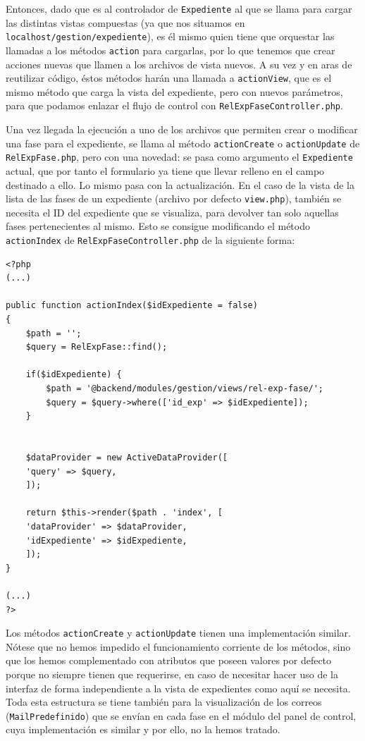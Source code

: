 Entonces, dado que es al controlador de \texttt{Expediente} al que se llama para cargar las distintas vistas compuestas (ya que nos situamos en \texttt{localhost/gestion/expediente}), es él mismo quien tiene que orquestar las llamadas a los métodos \texttt{action} para cargarlas, por lo que tenemos que crear acciones nuevas que llamen a los archivos de vista nuevos. A su vez y en aras de reutilizar código, éstos métodos harán una llamada a \texttt{actionView}, que es el mismo método que carga la vista del expediente, pero con nuevos parámetros, para que podamos enlazar el flujo de control con \texttt{RelExpFaseController.php}.

Una vez llegada la ejecución a uno de los archivos que permiten crear o modificar una fase para el expediente, se llama al método \texttt{actionCreate} o \texttt{actionUpdate} de \texttt{RelExpFase.php}, pero con una novedad: se pasa como argumento el \texttt{Expediente} actual, que por tanto el formulario ya tiene que llevar relleno en el campo destinado a ello. Lo mismo pasa con la actualización. En el caso de la vista de la lista de las fases de un expediente (archivo por defecto \texttt{view.php}), también se necesita el ID del expediente que se visualiza, para devolver tan solo aquellas fases pertenecientes al mismo. Esto se consigue modificando el método \texttt{actionIndex} de \texttt{RelExpFaseController.php} de la siguiente forma:

\begin{verbatim}
<?php
(...)

public function actionIndex($idExpediente = false)
{
	$path = '';
	$query = RelExpFase::find();
	
	if($idExpediente) {
		$path = '@backend/modules/gestion/views/rel-exp-fase/';
		$query = $query->where(['id_exp' => $idExpediente]);
	}
	
	
	$dataProvider = new ActiveDataProvider([
	'query' => $query,
	]);
	
	return $this->render($path . 'index', [
	'dataProvider' => $dataProvider,
	'idExpediente' => $idExpediente,
	]);
}

(...)
?>
\end{verbatim}

Los métodos \texttt{actionCreate} y \texttt{actionUpdate} tienen una implementación similar. Nótese que no hemos impedido el funcionamiento corriente de los métodos, sino que los hemos complementado con atributos que poseen valores por defecto porque no siempre tienen que requerirse, en caso de necesitar hacer uso de la interfaz de forma independiente a la vista de expedientes como aquí se necesita. Toda esta estructura se tiene también para la visualización de los correos (\texttt{MailPredefinido}) que se envían en cada fase en el módulo del panel de control, cuya implementación es similar y por ello, no la hemos tratado.


